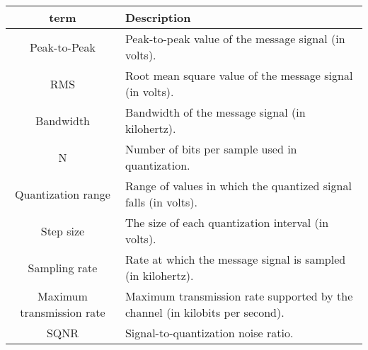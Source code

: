 \begin{center}
    \begin{tabular}{|c|p{8cm}|}
    \hline
    \textbf{term} & \textbf{Description} \\
    \hline
    Peak-to-Peak & Peak-to-peak value of the message signal (in volts). \\
    \hline
    RMS & Root mean square value of the message signal (in volts). \\
    \hline
    Bandwidth & Bandwidth of the message signal (in kilohertz). \\
    \hline
    N & Number of bits per sample used in quantization. \\
    \hline
    Quantization range & Range of values in which the quantized signal falls (in volts). \\
    \hline
    Step size & The size of each quantization interval (in volts). \\
    \hline
    Sampling rate & Rate at which the message signal is sampled (in kilohertz). \\
    \hline
    Maximum transmission rate & Maximum transmission rate supported by the channel (in kilobits per second). \\
    \hline
    SQNR & Signal-to-quantization noise ratio. \\
    \hline
    \end{tabular}
\end{center}
